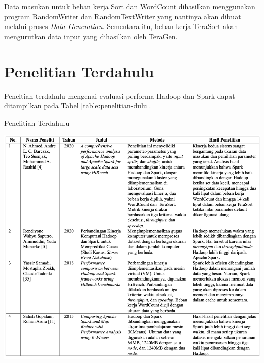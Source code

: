 Data masukan untuk beban kerja Sort dan WordCount dihasilkan menggunakan program RandomWriter dan RandomTextWriter yang nantinya akan dibuat melalui proses \textit{Data Generation}. Sementara itu, beban kerja TeraSort akan mengurutkan data input yang dihasilkan oleh TeraGen.

\section{Penelitian Terdahulu}
Peneltian terdahulu mengenai evaluasi performa Hadoop dan Spark dapat ditampilkan pada Tabel \ref{table:penelitian-dulu}.

\begin{table}[h]
  \centering
  \caption{Penelitian Terdahulu}
  \includegraphics[width=1\textwidth]{figures/ch02/comparison-thesis}
  \label{table:penelitian-dulu}
\end{table}
